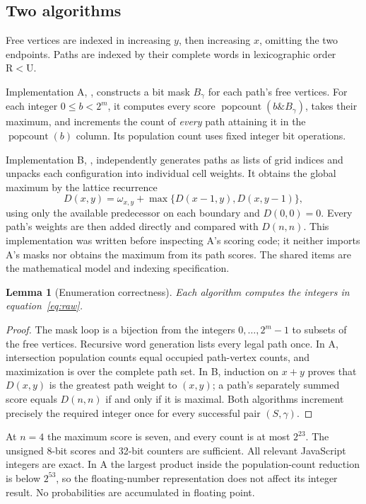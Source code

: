 \documentclass[11pt,a4paper]{article}
\newtheorem{lemma}[theorem]{Lemma}
\newcommand{\R}{\mathrm R}
\newcommand{\U}{\mathrm U}
\begin{document}
\subsection{Two algorithms}
Free vertices are indexed in increasing $y$, then increasing $x$,
omitting the two endpoints. Paths are indexed by their complete words
in lexicographic order $\R<\U$.

Implementation A, , constructs a bit mask
$B_\gamma$ for each path's free vertices. For each integer
$0\leq b<2^m$, it computes every score
$\operatorname{popcount}(b\mathbin{\&}B_\gamma)$, takes their maximum,
and increments the count of \emph{every} path attaining it in the
$\operatorname{popcount}(b)$ column. Its population count uses fixed
integer bit operations.

Implementation B, , independently generates paths
as lists of grid indices and unpacks each configuration into individual
cell weights. It obtains the global maximum by the lattice recurrence
\[
 D(x,y)=\omega_{x,y}+\max\{D(x-1,y),D(x,y-1)\},
\]
using only the available predecessor on each boundary and
$D(0,0)=0$. Every path's weights are then added directly and compared
with $D(n,n)$. This implementation was written before inspecting A's
scoring code; it neither imports A's masks nor obtains the maximum from
its path scores. The shared items are the mathematical model and
indexing specification.

\begin{lemma}[Enumeration correctness]
Each algorithm computes the integers in equation~\eqref{eq:raw}.
\end{lemma}
\begin{proof}
The mask loop is a bijection from the integers $0,\ldots,2^m-1$ to
subsets of the free vertices. Recursive word generation lists every
legal path once. In A, intersection population counts equal occupied
path-vertex counts, and maximization is over the complete path set.
In B, induction on $x+y$ proves that $D(x,y)$ is the greatest path
weight to $(x,y)$; a path's separately summed score equals $D(n,n)$
if and only if it is maximal. Both algorithms increment precisely
the required integer once for every successful pair $(S,\gamma)$.
\end{proof}

At $n=4$ the maximum score is seven, and every count is at most
$2^{23}$. The unsigned 8-bit scores and 32-bit counters are sufficient.
All relevant JavaScript integers are exact. In A the largest product
inside the population-count reduction is below $2^{53}$, so the
floating-number representation does not affect its integer result.
No probabilities are accumulated in floating point.
\end{document}
